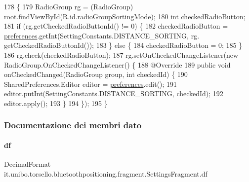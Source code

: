 \begin{DoxyCode}
178                                        \{
179         RadioGroup rg = (RadioGroup) root.findViewById(R.id.radioGroupSortingMode);
180         \textcolor{keywordtype}{int} checkedRadioButton;
181         \textcolor{keywordflow}{if} (rg.getCheckedRadioButtonId() != 0) \{
182             checkedRadioButton = \hyperlink{classit_1_1unibo_1_1torsello_1_1bluetoothpositioning_1_1fragment_1_1SettingsFragment_a52480c4d5d81ca59fe4a98ae3c623ea4_a52480c4d5d81ca59fe4a98ae3c623ea4}{preferences}.getInt(SettingConstants.DISTANCE\_SORTING, rg.
      getCheckedRadioButtonId());
183         \} \textcolor{keywordflow}{else} \{
184             checkedRadioButton = 0;
185         \}
186         rg.check(checkedRadioButton);
187         rg.setOnCheckedChangeListener(\textcolor{keyword}{new} RadioGroup.OnCheckedChangeListener() \{
188             @Override
189             \textcolor{keyword}{public} \textcolor{keywordtype}{void} onCheckedChanged(RadioGroup group, \textcolor{keywordtype}{int} checkedId) \{
190                 SharedPreferences.Editor editor = \hyperlink{classit_1_1unibo_1_1torsello_1_1bluetoothpositioning_1_1fragment_1_1SettingsFragment_a52480c4d5d81ca59fe4a98ae3c623ea4_a52480c4d5d81ca59fe4a98ae3c623ea4}{preferences}.edit();
191                 editor.putInt(SettingConstants.DISTANCE\_SORTING, checkedId);
192                 editor.apply();
193             \}
194         \});
195     \}
\end{DoxyCode}


\subsubsection{Documentazione dei membri dato}
\hypertarget{classit_1_1unibo_1_1torsello_1_1bluetoothpositioning_1_1fragment_1_1SettingsFragment_af6b80a700dc80c39a56d001b68a47694_af6b80a700dc80c39a56d001b68a47694}{}\label{classit_1_1unibo_1_1torsello_1_1bluetoothpositioning_1_1fragment_1_1SettingsFragment_af6b80a700dc80c39a56d001b68a47694_af6b80a700dc80c39a56d001b68a47694} 
\paragraph{\texorpdfstring{df}{df}}
{\footnotesize\ttfamily Decimal\+Format it.\+unibo.\+torsello.\+bluetoothpositioning.\+fragment.\+Settings\+Fragment.\+df\hspace{0.3cm}{\ttfamily [private]}}

